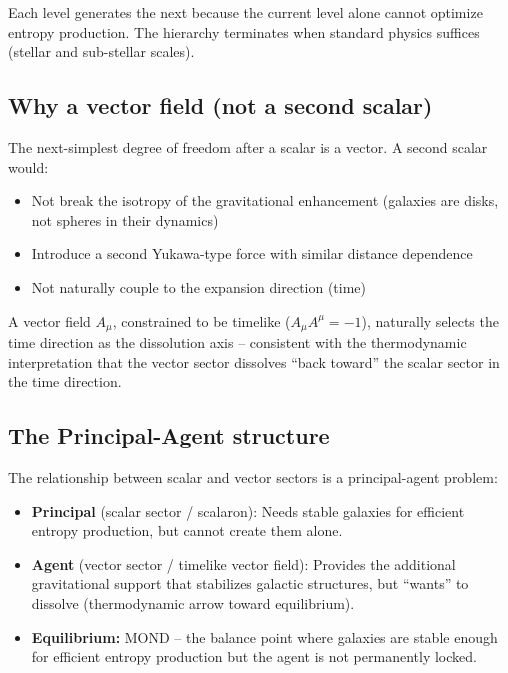 \documentclass[aps,prd,twocolumn,superscriptaddress,nofootinbib]{revtex4-2}
\begin{document}
Each level generates the next because the current level alone cannot optimize entropy production. The hierarchy terminates when standard physics suffices (stellar and sub-stellar scales).

\subsection{Why a vector field (not a second scalar)}
\label{sec:why_vector_not_scalar}

The next-simplest degree of freedom after a scalar is a vector. A second scalar would:
\begin{itemize}
\item Not break the isotropy of the gravitational enhancement (galaxies are disks, not spheres in their dynamics)
\item Introduce a second Yukawa-type force with similar distance dependence
\item Not naturally couple to the expansion direction (time)
\end{itemize}

A vector field $A_\mu$, constrained to be timelike ($A_\mu A^\mu = -1$), naturally selects the time direction as the dissolution axis -- consistent with the thermodynamic interpretation that the vector sector dissolves ``back toward'' the scalar sector in the time direction.

\subsection{The Principal-Agent structure}
\label{sec:principal_agent}

The relationship between scalar and vector sectors is a principal-agent problem:
\begin{itemize}
\item \textbf{Principal} (scalar sector / scalaron): Needs stable galaxies for efficient entropy production, but cannot create them alone.
\item \textbf{Agent} (vector sector / timelike vector field): Provides the additional gravitational support that stabilizes galactic structures, but ``wants'' to dissolve (thermodynamic arrow toward equilibrium).
\item \textbf{Equilibrium:} MOND -- the balance point where galaxies are stable enough for efficient entropy production but the agent is not permanently locked.
\end{itemize}
\end{document}
